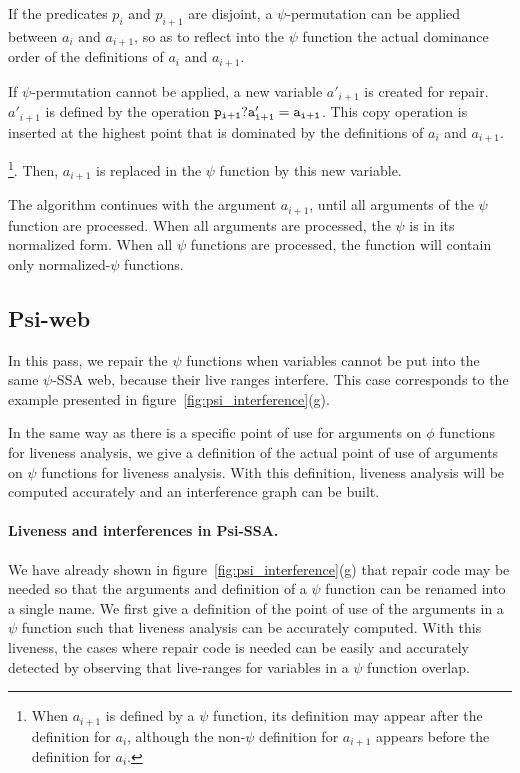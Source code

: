 If the predicates $p_i$ and $p_{i+1}$ are disjoint, a
$\psi$-permutation can be applied between $a_i$ and $a_{i+1}$, so as
to reflect into the $\psi$ function the actual dominance order of the
definitions of $a_i$ and $a_{i+1}$.

If $\psi$-permutation cannot be applied, a new variable $a'_{i+1}$ is
created for repair. $a'_{i+1}$ is defined by the operation ${\tt
  p_{i+1}? a'_{i+1} = a_{i+1}}$. This copy operation is inserted at
the highest point that is dominated by the definitions of $a_i$ and
$a_{i+1}$.

\footnote{When $a_{i+1}$ is defined by a $\psi$ function, its
  definition may appear after the definition for $a_i$, although the
  non-$\psi$ definition for $a_{i+1}$ appears before the definition
  for $a_i$.}. Then, $a_{i+1}$ is replaced in the $\psi$ function by
this new variable.

The algorithm continues with the argument $a_{i+1}$, until all
arguments of the $\psi$ function are processed. When all arguments
are processed, the $\psi$ is in its normalized form. When all $\psi$
functions are processed, the function will contain only
normalized-$\psi$ functions.


\subsection{Psi-web}

In this pass, we repair the $\psi$ functions when variables cannot be
put into the same $\psi$-SSA web, because their live ranges
interfere. This case corresponds to the example presented in
figure~\ref{fig:psi_interference}(g).

In the same way as there is a specific point of use for arguments on
$\phi$ functions for liveness analysis, we give a definition of the
actual point of use of arguments on $\psi$ functions for liveness
analysis. With this definition, liveness analysis will be computed
accurately and an interference graph can be built.

\paragraph{Liveness and interferences in Psi-SSA.}
We have already shown in figure~\ref{fig:psi_interference}(g) that
repair code may be needed so that the arguments and definition of a
$\psi$ function can be renamed into a single name. We first give a
definition of the point of use of the arguments in a $\psi$ function
such that liveness analysis can be accurately computed. With this
liveness, the cases where repair code is needed can be easily and
accurately detected by observing that live-ranges for variables in a
$\psi$ function overlap.

